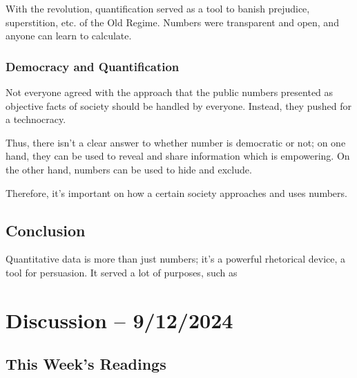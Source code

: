\documentclass[openany]{book}
\begin{document}
With the revolution, quantification served as a tool to banish prejudice, superstition, etc. of the Old Regime. Numbers were transparent and open, and anyone can learn to calculate.

\subsubsection{Democracy and Quantification}
Not everyone agreed with the approach that the public numbers presented as objective facts of society should be handled by everyone. Instead, they pushed for a technocracy.

Thus, there isn't a clear answer to whether number is democratic or not; on one hand, they can be used to reveal and share information which is empowering. On the other hand, numbers can be used to hide and exclude.

Therefore, it's important on how a certain society approaches and uses numbers.

\subsection{Conclusion}
Quantitative data is more than just numbers; it's a powerful rhetorical device, a tool for persuasion. It served a lot of purposes, such as 

\section{Discussion -- 9/12/2024}
\subsection{This Week's Readings}
\end{document}
